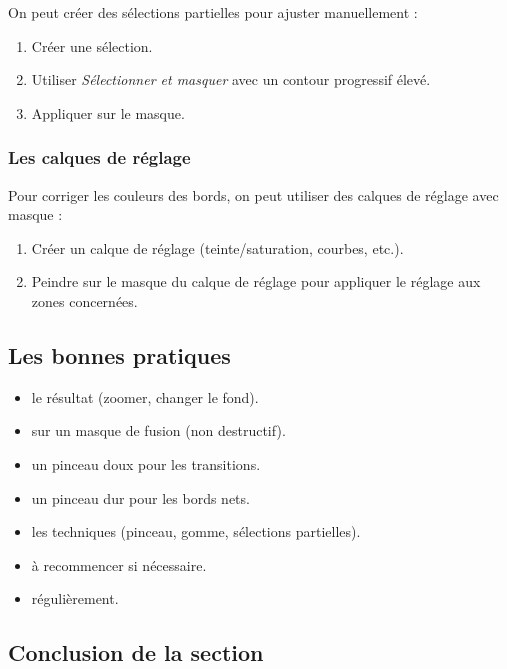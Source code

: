 On peut créer des sélections partielles pour ajuster manuellement :

\begin{enumerate}
    \item Créer une sélection.
    \item Utiliser \emph{Sélectionner et masquer} avec un contour progressif élevé.
    \item Appliquer sur le masque.
\end{enumerate}

\subsubsection{Les calques de réglage}

Pour corriger les couleurs des bords, on peut utiliser des calques de réglage avec masque :

\begin{enumerate}
    \item Créer un calque de réglage (teinte/saturation, courbes, etc.).
    \item Peindre sur le masque du calque de réglage pour appliquer le réglage aux zones concernées.
\end{enumerate}

\subsection{Les bonnes pratiques}

\begin{itemize}
    \item {} le résultat (zoomer, changer le fond).
    \item {} sur un masque de fusion (non destructif).
    \item {} un pinceau doux pour les transitions.
    \item {} un pinceau dur pour les bords nets.
    \item {} les techniques (pinceau, gomme, sélections partielles).
    \item {} à recommencer si nécessaire.
    \item {} régulièrement.
\end{itemize}

\subsection*{Conclusion de la section}

